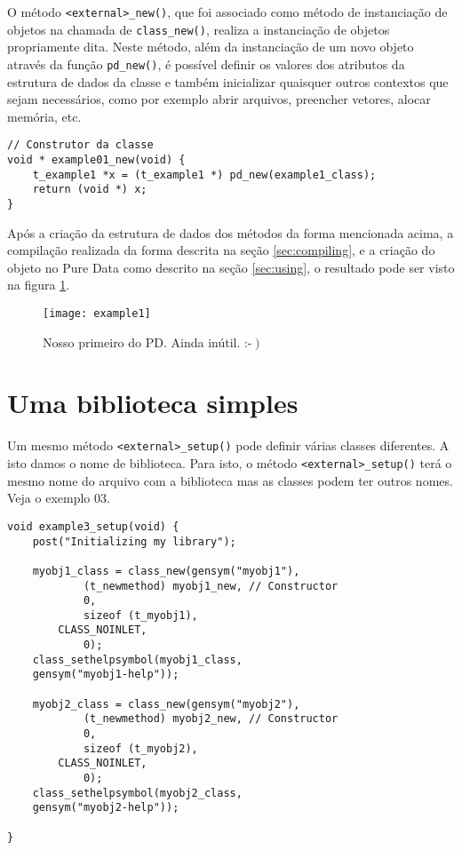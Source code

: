 O método \texttt{<external>\_new()}, que foi associado como método de
instanciação de objetos na chamada de \texttt{class\_new()}, realiza a
instanciação de objetos propriamente dita. Neste método, além da instanciação
de um novo objeto através da função \texttt{pd\_new()}, é possível definir os
valores dos atributos da estrutura de dados da classe e também inicializar
quaisquer outros contextos que sejam necessários, como por exemplo abrir
arquivos, preencher vetores, alocar memória, etc.

\vspace{1em}
\begin{lstlisting}
// Construtor da classe
void * example01_new(void) {
    t_example1 *x = (t_example1 *) pd_new(example1_class);
    return (void *) x;
}
\end{lstlisting}

Após a criação da estrutura de dados dos métodos da forma mencionada acima, a
compilação realizada da forma descrita na seção \ref{sec:compiling}, e a
criação do objeto no Pure Data como descrito na seção \ref{sec:using}, o
resultado pode ser visto na figura \ref{fig:example01working}.

\begin{figure}[h!]
  \centering
  \texttt{[image: example1]}
  \caption{Nosso primeiro \external do PD. Ainda inútil. :-$\left.\right)$}
  \label{fig:example01working}
\end{figure}

\section{Uma biblioteca simples}

Um mesmo método \texttt{<external>\_setup()} pode definir várias classes
diferentes. A isto damos o nome de biblioteca. Para isto, o método
\texttt{<external>\_setup()} terá o mesmo nome do arquivo com a biblioteca mas
as classes  podem ter outros nomes. Veja o exemplo 03.

\vspace{1em}
\begin{lstlisting}
void example3_setup(void) {
    post("Initializing my library");

    myobj1_class = class_new(gensym("myobj1"),
            (t_newmethod) myobj1_new, // Constructor
            0,
            sizeof (t_myobj1),
	    CLASS_NOINLET,
            0);
    class_sethelpsymbol(myobj1_class, 
	gensym("myobj1-help"));

    myobj2_class = class_new(gensym("myobj2"),
            (t_newmethod) myobj2_new, // Constructor
            0,
            sizeof (t_myobj2),
	    CLASS_NOINLET,
            0);
    class_sethelpsymbol(myobj2_class, 
	gensym("myobj2-help"));

}
\end{lstlisting}

